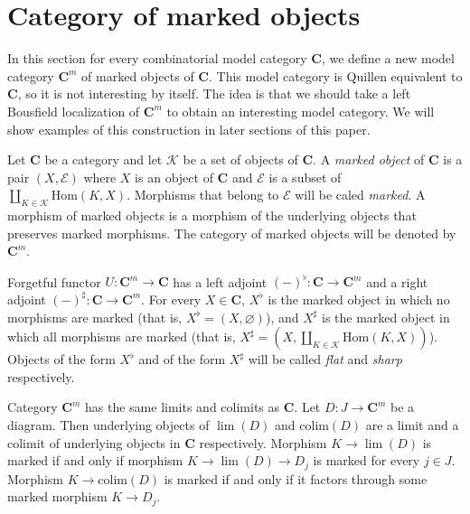 \documentclass[reqno]{amsart}
\theoremstyle{definition}
\theoremstyle{remark}
\newcommand{\cat}[1]{\mathbf{#1}}
\newcommand{\C}{\cat{C}}
\newcommand{\Hom}{\mathrm{Hom}}
\newcommand{\colim}{\mathrm{colim}}
\numberwithin{figure}{section}
\begin{document}
\section{Category of marked objects}

In this section for every combinatorial model category $\C$, we define a new model category $\C^m$ of marked objects of $\C$.
This model category is Quillen equivalent to $\C$, so it is not interesting by itself.
The idea is that we should take a left Bousfield localization of $\C^m$ to obtain an interesting model category.
We will show examples of this construction in later sections of this paper.

\begin{defn}
Let $\C$ be a category and let $\mathcal{K}$ be a set of objects of $\C$.
A \emph{marked object} of $\C$ is a pair $(X,\mathcal{E})$ where $X$ is an object of $\C$ and $\mathcal{E}$ is a subset of $\coprod_{K \in \mathcal{K}} \Hom(K,X)$.
Morphisms that belong to $\mathcal{E}$ will be caled \emph{marked}.
A morphism of marked objects is a morphism of the underlying objects that preserves marked morphisms.
The category of marked objects will be denoted by $\C^m$.
\end{defn}

Forgetful functor $U : \C^m \to \C$ has a left adjoint $(-)^\flat : \C \to \C^m$ and a right adjoint $(-)^\sharp : \C \to \C^m$.
For every $X \in \C$, $X^\flat$ is the marked object in which no morphisms are marked (that is, $X^\flat = (X,\varnothing)$),
and $X^\sharp$ is the marked object in which all morphisms are marked (that is, $X^\sharp = (X,\coprod_{K \in \mathcal{K}} \Hom(K,X))$).
Objects of the form $X^\flat$ and of the form $X^\sharp$ will be called \emph{flat} and \emph{sharp} respectively.

Category $\C^m$ has the same limits and colimits as $\C$.
Let $D : J \to \C^m$ be a diagram.
Then underlying objects of $\lim(D)$ and $\colim(D)$ are a limit and a colimit of underlying objects in $\C$ respectively.
Morphism $K \to \lim(D)$ is marked if and only if morphism $K \to \lim(D) \to D_j$ is marked for every $j \in J$.
Morphism $K \to \colim(D)$ is marked if and only if it factors through some marked morphism $K \to D_j$.
\end{document}
